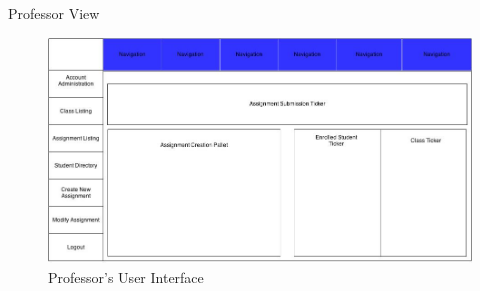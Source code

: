     \begin{section}{Professor View}
        \begin{figure}[h!]
                \centerline{\includegraphics[width=13cm]{ProfessorView.jpg}}
                \caption{Professor's User Interface}
        \end{figure}
    \end{section}
    \newpage

